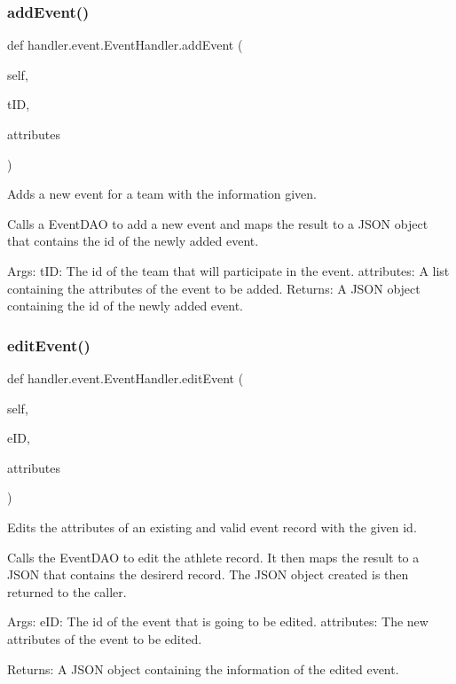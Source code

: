 \subsubsection{\texorpdfstring{add\+Event()}{addEvent()}}
{\footnotesize\ttfamily def handler.\+event.\+Event\+Handler.\+add\+Event (\begin{DoxyParamCaption}\item[{}]{self,  }\item[{}]{t\+ID,  }\item[{}]{attributes }\end{DoxyParamCaption})}

\begin{DoxyVerb}Adds a new event for a team with the information given.

Calls a EventDAO to add a new event and maps the 
result to a JSON object that contains the id of the newly added 
event.

Args:
    tID: The id of the team that will participate in the event.
    attributes: A list containing the attributes of the event to
        be added.
Returns:
    A JSON object containing the id of the newly added event.\end{DoxyVerb}
 \mbox{\label{classhandler_1_1event_1_1_event_handler_a80dc5621cd54f90b135642db51183d7c}} 
\subsubsection{\texorpdfstring{edit\+Event()}{editEvent()}}
{\footnotesize\ttfamily def handler.\+event.\+Event\+Handler.\+edit\+Event (\begin{DoxyParamCaption}\item[{}]{self,  }\item[{}]{e\+ID,  }\item[{}]{attributes }\end{DoxyParamCaption})}

\begin{DoxyVerb}Edits the attributes of an existing and valid event record with
the given id.

Calls the EventDAO to edit the athlete record. It then maps the result
to a JSON that contains the desirerd record. The JSON object created is
then returned to the caller.

Args:
    eID: The id of the event that is going to be edited.
    attributes: The new attributes of the event to be edited.

Returns:
    A JSON object containing the information of the edited event.
\end{DoxyVerb}
 \mbox{\label{classhandler_1_1event_1_1_event_handler_a5ea11d438c3a6c39524dcde68f87a6c2}} 
